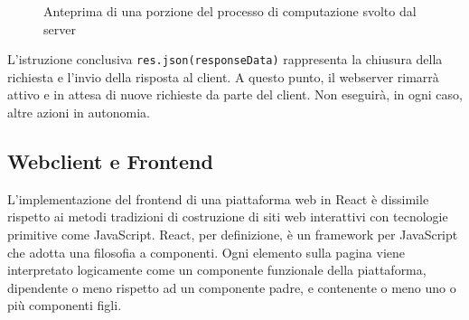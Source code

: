 \begin{figure}[ht!]
    \centering
    \caption{Anteprima di una porzione del processo di computazione svolto dal server}
    \label{fig:esempio}
\end{figure}


L'istruzione conclusiva \verb|res.json(responseData)| rappresenta la chiusura della richiesta e l'invio della risposta al client. A questo punto, il webserver rimarrà attivo e in attesa di nuove richieste da parte del client. Non eseguirà, in ogni caso, altre azioni in autonomia.

\subsection{Webclient e Frontend}

L'implementazione del frontend di una piattaforma web in React è dissimile rispetto ai metodi tradizioni di costruzione di siti web interattivi con tecnologie primitive come JavaScript. React, per definizione, è un framework per JavaScript che adotta una filosofia a componenti. Ogni elemento sulla pagina viene interpretato logicamente come un componente funzionale della piattaforma, dipendente o meno rispetto ad un componente padre, e contenente o meno uno o più componenti figli. 

